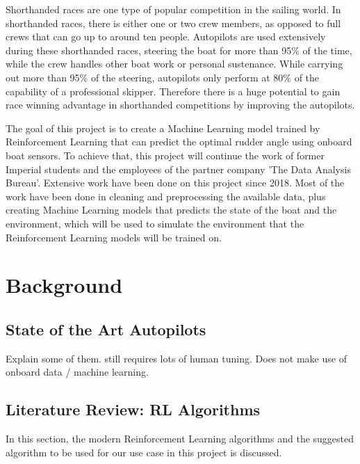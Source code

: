 \documentclass[12pt,twoside]{report}
\begin{document}
Shorthanded races are one type of popular competition in the sailing world. In shorthanded races, there is either one or two crew members, as opposed to full crews that can go up to around ten people. Autopilots are used extensively during these shorthanded races, steering the boat for more than 95\% of the time, while the crew handles other boat work or personal sustenance. While carrying out more than 95\% of the steering, autopilots only perform at 80\% of the capability of a professional skipper. Therefore there is a huge potential to gain race winning advantage in shorthanded competitions by improving the autopilots.

The goal of this project is to create a Machine Learning model trained by Reinforcement Learning that can predict the optimal rudder angle using onboard boat sensors. To achieve that, this project will continue the work of former Imperial students and the employees of the partner company 'The Data Analysis Bureau'. Extensive work have been done on this project since 2018. Most of the work have been done in cleaning and preprocessing the available data, plus creating Machine Learning models that predicts the state of the boat and the environment, which will be used to simulate the environment that the Reinforcement Learning models will be trained on.




\chapter{Background}

\section{State of the Art Autopilots}
Explain some of them.
still requires lots of human tuning.
Does not make use of onboard data / machine learning.

\section{Literature Review: RL Algorithms}
In this section, the modern Reinforcement Learning algorithms and the suggested algorithm to be used for our use case in this project is discussed.
\end{document}

